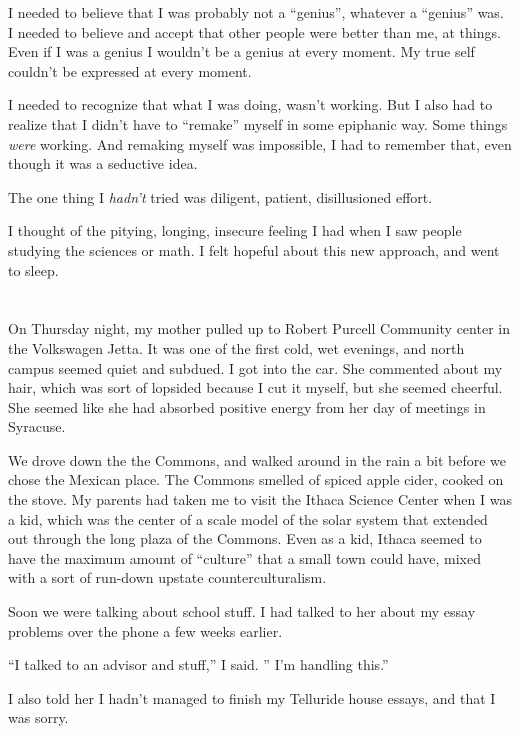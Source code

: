 I needed to believe that I was probably not a ``genius'', whatever a ``genius''
was.  I needed to believe and accept that other people were better than me, at
things.  Even if I was a genius I wouldn't be a genius at every moment.  My true
self couldn't be expressed at every moment.  

I needed to recognize that what I was doing, wasn't working.  But I also had to
realize that I didn't have to ``remake'' myself in some epiphanic way.  Some
things \textit{were} working.  And remaking myself was impossible, I had to
remember that, even though it was a seductive idea. 

The one thing I \textit{hadn't} tried was diligent, patient, disillusioned
effort.

I thought of the pitying, longing, insecure feeling I had when I saw people
studying the sciences or math.  I felt hopeful about this new approach, and went
to sleep. 

\section{}

On Thursday night, my mother pulled up to Robert Purcell Community center in the
Volkswagen Jetta.  It was one of the first cold, wet evenings, and north campus
seemed quiet and subdued.  I got into the car.  She commented about my hair,
which was sort of lopsided because I cut it myself, but she seemed cheerful.
She seemed like she had absorbed positive energy from her day of meetings in
Syracuse.  

We drove down the the Commons, and walked around in the rain a bit before we
chose the Mexican place.  The Commons smelled of spiced apple cider, cooked on
the stove.  My parents had taken me to visit the Ithaca Science Center when I
was a kid, which was the center of a scale model of the solar system that
extended out through the long plaza of the Commons.  Even as a kid, Ithaca
seemed to have the maximum amount of ``culture'' that a small town could have,
mixed with a sort of run-down upstate counterculturalism.

Soon we were talking about school stuff.  I had talked to her about my essay
problems over the phone a few weeks earlier. 

``I talked to an advisor and stuff,'' I said.   '' I'm handling this.''

I also told her I hadn't managed to finish my Telluride house essays, and that I
was sorry.  

